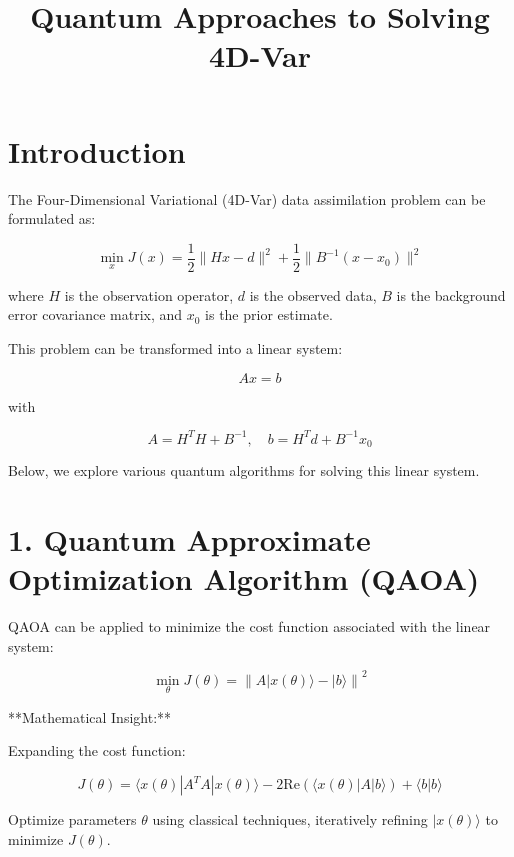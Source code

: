 \documentclass{article}
\title{Quantum Approaches to Solving 4D-Var}
\author{}
\date{}
\begin{document}
\maketitle

\section{Introduction}

The Four-Dimensional Variational (4D-Var) data assimilation problem can be formulated as:

\begin{equation}
\min_x J(x) = \frac{1}{2} \| Hx - d \|^2 + \frac{1}{2} \| B^{-1}(x - x_0) \|^2
\end{equation}

where \( H \) is the observation operator, \( d \) is the observed data, \( B \) is the background error covariance matrix, and \( x_0 \) is the prior estimate.

This problem can be transformed into a linear system:

\begin{equation}
Ax = b
\end{equation}

with

\[
A = H^TH + B^{-1}, \quad b = H^Td + B^{-1}x_0
\]

Below, we explore various quantum algorithms for solving this linear system.

\section{1. Quantum Approximate Optimization Algorithm (QAOA)}

QAOA can be applied to minimize the cost function associated with the linear system:

\begin{equation}
\min_{\theta} J(\theta) = \left\| A |x(\theta)\rangle - |b\rangle \right\|^2
\end{equation}

**Mathematical Insight:**

Expanding the cost function:

\[
J(\theta) = \langle x(\theta)| A^TA |x(\theta)\rangle - 2\text{Re}\left(\langle x(\theta)| A |b\rangle\right) + \langle b|b\rangle
\]

Optimize parameters \( \theta \) using classical techniques, iteratively refining \( |x(\theta)\rangle \) to minimize \( J(\theta) \).
\end{document}
